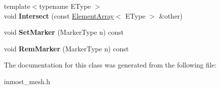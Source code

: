 \begin{DoxyCompactItemize}
\item 
\hypertarget{classINMOST_1_1ElementArray_a237ae0b4fb711b1b0a36041fe97ef1b3}{{\footnotesize template$<$typename E\-Type $>$ }\\void {\bfseries Intersect} (const \hyperlink{classINMOST_1_1ElementArray}{Element\-Array}$<$ E\-Type $>$ \&other)}\label{classINMOST_1_1ElementArray_a237ae0b4fb711b1b0a36041fe97ef1b3}

\item 
\hypertarget{classINMOST_1_1ElementArray_ae122650da027b7033fa56668cdb9c8eb}{void {\bfseries Set\-Marker} (Marker\-Type n) const }\label{classINMOST_1_1ElementArray_ae122650da027b7033fa56668cdb9c8eb}

\item 
\hypertarget{classINMOST_1_1ElementArray_aafb5731434517c9ba297f972e0f1ac78}{void {\bfseries Rem\-Marker} (Marker\-Type n) const }\label{classINMOST_1_1ElementArray_aafb5731434517c9ba297f972e0f1ac78}

\end{DoxyCompactItemize}


The documentation for this class was generated from the following file\-:\begin{DoxyCompactItemize}
\item 
inmost\-\_\-mesh.\-h\end{DoxyCompactItemize}
